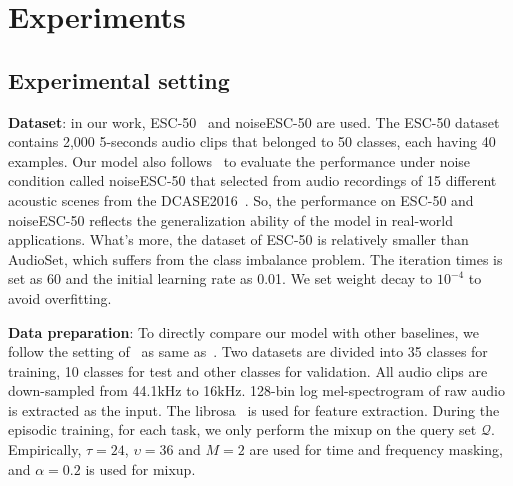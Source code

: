 \documentclass[a4paper]{article}
\begin{document}
\section{Experiments}


\subsection{Experimental setting}

\textbf{Dataset}: in our work, ESC-50~\cite{ESC_dataset_50} and noiseESC-50 are used. The ESC-50 dataset contains 2,000 5-seconds audio clips that belonged to 50 classes, each having 40 examples. 
Our model also follows~\cite{attentionSimilarity} to evaluate the performance under noise condition called noiseESC-50 that selected from audio recordings of 15 different acoustic scenes from the DCASE2016~\cite{TUTDatatbase}.
So, the performance on ESC-50 and noiseESC-50 reflects the generalization ability of the model in real-world applications. 
What's more, the dataset of ESC-50 is relatively smaller than AudioSet, which suffers from the class imbalance problem. 
The iteration times is set as 60 and the initial learning rate as 0.01. We set weight decay to $10^{-4}$ to avoid overfitting.

\noindent\textbf{Data preparation}: To directly compare our model with other baselines, we follow the setting of~\cite{MatchNet} as same as~\cite{attentionSimilarity}. Two datasets are divided into 35 classes for training, 10 classes for test and other classes for validation. All audio clips are down-sampled from 44.1kHz to 16kHz. 128-bin log mel-spectrogram of raw audio is extracted as the input. The librosa~\cite{librosa} is used for feature extraction. During the episodic training, for each task, we only perform the mixup on the query set $\mathcal{Q}$.  
Empirically, $\tau=24$, $\upsilon=36$ and $M=2$ are used for time and frequency masking, and $\alpha=0.2$  is used for mixup.
\end{document}
